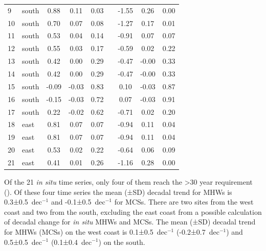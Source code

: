 \documentclass[a4paper,10pt,review]{elsarticle}
\begin{document}
\begin{table}[]
\begin{tiny}
\begin{tabular}{llccccccc}
  9 & south & 0.88 & 0.11 & 0.03 && -1.55 & 0.26 & 0.00 \\ 
  10 & south & 0.70 & 0.07 & 0.08 && -1.27 & 0.17 & 0.01 \\ 
  11 & south & 0.53 & 0.04 & 0.14 && -0.91 & 0.07 & 0.07 \\ 
  12 & south & 0.55 & 0.03 & 0.17 && -0.59 & 0.02 & 0.22 \\ 
  13 & south & 0.42 & 0.00 & 0.29 && -0.47 & -0.00 & 0.33 \\ 
  14 & south & 0.42 & 0.00 & 0.29 && -0.47 & -0.00 & 0.33 \\ 
  15 & south & -0.09 & -0.03 & 0.83 && 0.10 & -0.03 & 0.87 \\ 
  16 & south & -0.15 & -0.03 & 0.72 && 0.07 & -0.03 & 0.91 \\ 
  17 & south & 0.22 & -0.02 & 0.62 && -0.71 & 0.02 & 0.20 \\ 
  18 & east & 0.81 & 0.07 & 0.07 && -0.94 & 0.11 & 0.04 \\ 
  19 & east & 0.81 & 0.07 & 0.07 && -0.94 & 0.11 & 0.04 \\ 
  20 & east & 0.53 & 0.02 & 0.22 && -0.64 & 0.06 & 0.09 \\ 
  21 & east & 0.41 & 0.01 & 0.26 && -1.16 & 0.28 & 0.00 \\ 
\bottomrule
\end{tabular}
\end{tiny}
\end{table}

Of the 21 \emph{in situ} time series, only four of them reach the >30 year requirement (). Of these four time series the mean (±SD) decadal trend for MHWs is 0.3±0.5~dec$^{-1}$ and -0.1±0.5~dec$^{-1}$ for MCSs. There are two sites from the west coast and two from the south, excluding the east coast from a possible calculation of decadal change for \emph{in situ} MHWs and MCSs. The mean (±SD) decadal trend for MHWs (MCSs) on the west coast is 0.1±0.5~dec$^{-1}$ (-0.2±0.7~dec$^{-1}$) and 0.5±0.5~dec$^{-1}$ (0.1±0.4~dec$^{-1}$) on the south.
\end{document}
